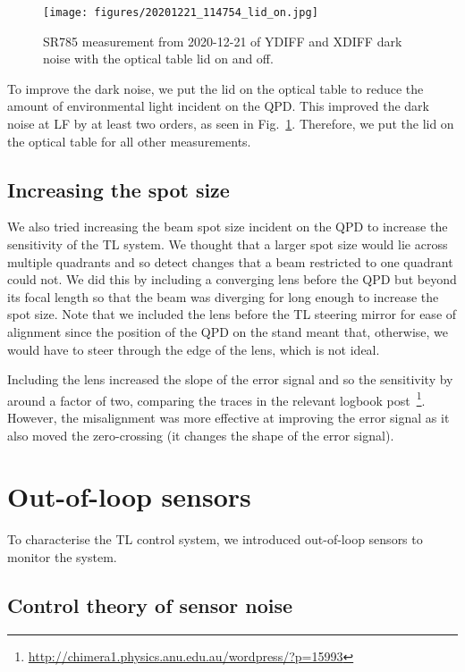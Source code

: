 \documentclass[aps,pra,superscriptaddress,reprint,nofootinbib]{revtex4-1}
\begin{document}
\begin{figure}
\texttt{[image: figures/20201221\_114754\_lid\_on.jpg]}
\caption{SR785 measurement from 2020-12-21 of YDIFF and XDIFF dark noise with the optical table lid on and off.}
\label{fig:dark_noise_lid_on}
\end{figure}

To improve the dark noise, we put the lid on the optical table to reduce the amount of environmental light incident on the QPD. This improved the dark noise at LF by at least two orders, as seen in Fig.~\ref{fig:dark_noise_lid_on}. Therefore, we put the lid on the optical table for all other measurements.

\subsection{Increasing the spot size}
\label{sec:spot_size}

We also tried increasing the beam spot size incident on the QPD to increase the sensitivity of the TL system. We thought that a larger spot size would lie across multiple quadrants and so detect changes that a beam restricted to one quadrant could not. We did this by including a converging lens before the QPD but beyond its focal length so that the beam was diverging for long enough to increase the spot size. Note that we included the lens before the TL steering mirror for ease of alignment since the position of the QPD on the stand meant that, otherwise, we would have to steer through the edge of the lens, which is not ideal.

Including the lens increased the slope of the error signal and so the sensitivity by around a factor of two, comparing the traces in the relevant logbook post~\footnote{\url{http://chimera1.physics.anu.edu.au/wordpress/?p=15993}}. However, the misalignment was more effective at improving the error signal as it also moved the zero-crossing (it changes the shape of the error signal).


\section{Out-of-loop sensors}
\label{sec:out-of-loop_sensors}

To characterise the TL control system, we introduced out-of-loop sensors to monitor the system.

\subsection{Control theory of sensor noise}
\end{document}
